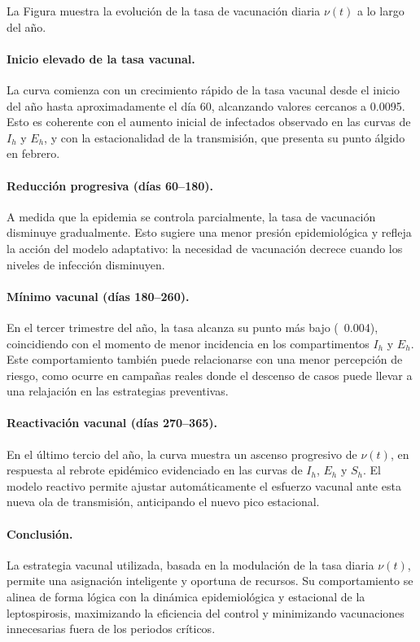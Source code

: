 \documentclass[12pt,a4paper]{article}
\begin{document}
La Figura muestra la evolución de la tasa de vacunación diaria $\nu(t)$ a lo largo del año. 

\paragraph{Inicio elevado de la tasa vacunal.} La curva comienza con un crecimiento rápido de la tasa vacunal desde el inicio del año hasta aproximadamente el día 60, alcanzando valores cercanos a 0.0095. Esto es coherente con el aumento inicial de infectados observado en las curvas de $I_h$ y $E_h$, y con la estacionalidad de la transmisión, que presenta su punto álgido en febrero.

\paragraph{Reducción progresiva (días 60–180).} A medida que la epidemia se controla parcialmente, la tasa de vacunación disminuye gradualmente. Esto sugiere una menor presión epidemiológica y refleja la acción del modelo adaptativo: la necesidad de vacunación decrece cuando los niveles de infección disminuyen.

\paragraph{Mínimo vacunal (días 180–260).} En el tercer trimestre del año, la tasa alcanza su punto más bajo (~0.004), coincidiendo con el momento de menor incidencia en los compartimentos $I_h$ y $E_h$. Este comportamiento también puede relacionarse con una menor percepción de riesgo, como ocurre en campañas reales donde el descenso de casos puede llevar a una relajación en las estrategias preventivas.

\paragraph{Reactivación vacunal (días 270–365).} En el último tercio del año, la curva muestra un ascenso progresivo de $\nu(t)$, en respuesta al rebrote epidémico evidenciado en las curvas de $I_h$, $E_h$ y $S_h$. El modelo reactivo permite ajustar automáticamente el esfuerzo vacunal ante esta nueva ola de transmisión, anticipando el nuevo pico estacional.

\paragraph{Conclusión.} La estrategia vacunal utilizada, basada en la modulación de la tasa diaria $\nu(t)$, permite una asignación inteligente y oportuna de recursos. Su comportamiento se alinea de forma lógica con la dinámica epidemiológica y estacional de la leptospirosis, maximizando la eficiencia del control y minimizando vacunaciones innecesarias fuera de los periodos críticos.
\end{document}
